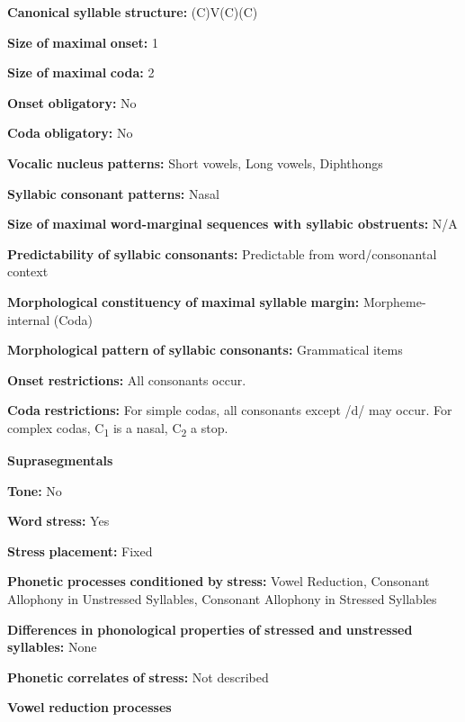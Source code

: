 \begin{styleBody}
\textbf{Canonical} \textbf{syllable} \textbf{structure:} (C)V(C)(C) \citep[6-9]{Sapir1965}

\textbf{Size} \textbf{of} \textbf{maximal} \textbf{onset:} 1

\textbf{Size} \textbf{of} \textbf{maximal} \textbf{coda:} 2

\textbf{Onset} \textbf{obligatory:} No

\textbf{Coda} \textbf{obligatory:} No

\textbf{Vocalic} \textbf{nucleus} \textbf{patterns:} Short vowels, Long vowels, Diphthongs

\textbf{Syllabic} \textbf{consonant} \textbf{patterns:} Nasal

\textbf{Size} \textbf{of} \textbf{maximal} \textbf{word{}-marginal sequences with syllabic obstruents:} N/A

\textbf{Predictability} \textbf{of} \textbf{syllabic} \textbf{consonants:} Predictable from word/consonantal context

\textbf{Morphological} \textbf{constituency} \textbf{of} \textbf{maximal} \textbf{syllable} \textbf{margin:} Morpheme-internal (Coda)

\textbf{Morphological} \textbf{pattern} \textbf{of} \textbf{syllabic} \textbf{consonants:} Grammatical items

\textbf{Onset} \textbf{restrictions:} All consonants occur.

\textbf{Coda} \textbf{restrictions:} For simple codas, all consonants except /d/ may occur. For complex codas, C\textsubscript{1} is a nasal, C\textsubscript{2} a stop.

\textbf{Suprasegmentals}

\textbf{Tone:} No

\textbf{Word} \textbf{stress:} Yes

\textbf{Stress} \textbf{placement:} Fixed

\textbf{Phonetic} \textbf{processes} \textbf{conditioned} \textbf{by} \textbf{stress:} Vowel Reduction, Consonant Allophony in Unstressed Syllables, Consonant Allophony in Stressed Syllables

\textbf{Differences} \textbf{in} \textbf{phonological} \textbf{properties} \textbf{of} \textbf{stressed} \textbf{and} \textbf{unstressed} \textbf{syllables:} None

\textbf{Phonetic} \textbf{correlates} \textbf{of} \textbf{stress:} Not described

\textbf{Vowel} \textbf{reduction} \textbf{processes}


\end{styleBody}
